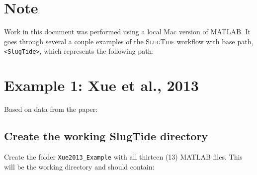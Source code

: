 \documentclass[11pt]{article}
\begin{document}
\tableofcontents


\newpage





\section{Note}

Work in this document was performed using a local Mac version of MATLAB.  It
goes through several a couple examples of the \textsc{SlugTide} workflow with base path,
\texttt{<SlugTide>}, which represents the following path: 






\section{Example 1: Xue et al., 2013}

Based on data from the \citet{Xue2013} paper:

\vspace{0.5cm}


\subsection{Create the working SlugTide directory}

Create the folder \texttt{Xue2013\_Example} with all thirteen (13) MATLAB
files. This will be the working directory and should contain:
\end{document}
